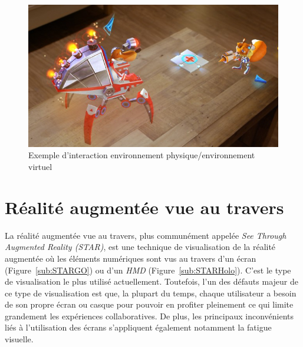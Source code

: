 \begin{figure}[H]
\centering
\includegraphics[scale=0.4]{images/youngconker}
\caption{Exemple d'interaction environnement physique/environnement virtuel\protect\footnotemark}
\label{fig:youngconker}
\end{figure}

\section{Réalité augmentée vue au travers}
La réalité augmentée vue au travers\cite{milgram1995augmented}, plus communément appelée \emph{See Through Augmented Reality (STAR)}, est une technique de visualisation de la réalité augmentée où les éléments numériques sont vus au travers d'un écran (Figure~\ref{sub:STARGO}) ou d'un \emph{HMD} (Figure~\ref{sub:STARHolo}). C'est le type de visualisation le plus utilisé actuellement. Toutefois, l'un des défauts majeur de ce type de visualisation est que, la plupart du temps, chaque utilisateur a besoin de son propre écran ou casque pour pouvoir en profiter pleinement ce qui limite grandement les expériences collaboratives. De plus, les principaux inconvénients liés à l'utilisation des écrans s'appliquent également notamment la fatigue visuelle.  

